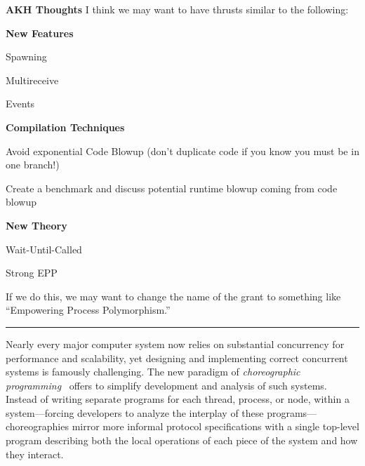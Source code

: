 \noindent\textbf{AKH Thoughts}
I think we may want to have thrusts similar to the following:
\begin{outline}[2]{}
\item \textbf{New Features}
  \begin{lvl}
  \item Spawning
  \item Multireceive 
  \item Events
  \end{lvl}
\item \textbf{Compilation Techniques}
  \begin{lvl}
  \item Avoid exponential Code Blowup (don't duplicate code if you know you must be in one branch!)
  \item Create a benchmark and discuss potential runtime blowup coming from code blowup
  \end{lvl}
\item \textbf{New Theory}
  \begin{lvl}
  \item Wait-Until-Called
  \item Strong EPP 
  \end{lvl}
\end{outline}

If we do this, we may want to change the name of the grant to something like ``Empowering Process Polymorphism.''

\vspace{0.5em}
\hrule
\vspace{0.5em}
\fi

Nearly every major computer system now relies on substantial concurrency for performance and scalability,
yet designing and implementing correct concurrent systems is famously challenging.
The new paradigm of \emph{choreographic programming}~\citep{Montesi13,Montesi23} offers to simplify development and analysis of such systems.
Instead of writing separate programs for each thread, process, or node, within a system---forcing developers to analyze the interplay of these programs---%
choreographies mirror more informal protocol specifications with a single top-level program
describing both the local operations of each piece of the system and how they interact.

